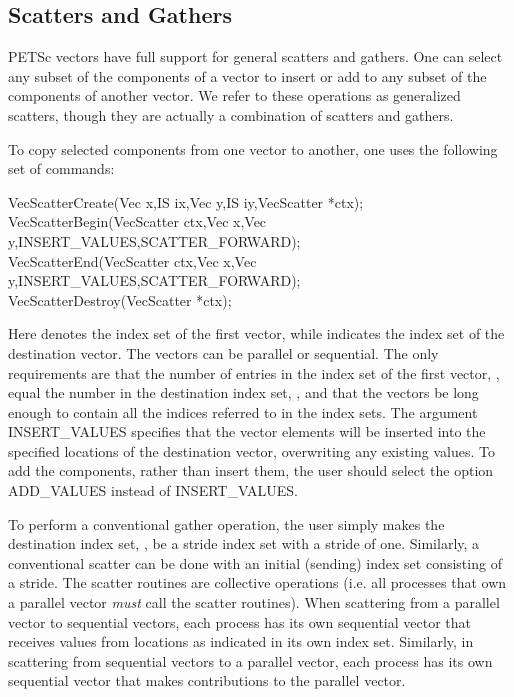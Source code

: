 \subsection{Scatters and Gathers}  
\label{sec_scatter}

PETSc vectors have full support for general scatters and
gathers. One can select any subset of the components of a vector to
insert or add to any subset of the components of another vector.
We refer to these operations as generalized scatters, though they are
actually a combination of scatters and gathers.

 
To copy selected components from one vector
to another, one uses the following set of commands:
\begin{tabbing}
  VecScatterCreate(Vec x,IS ix,Vec y,IS iy,VecScatter *ctx);\\
  VecScatterBegin(VecScatter ctx,Vec x,Vec y,INSERT\_VALUES,SCATTER\_FORWARD);\\
  VecScatterEnd(VecScatter ctx,Vec x,Vec y,INSERT\_VALUES,SCATTER\_FORWARD);\\
  VecScatterDestroy(VecScatter *ctx);
\end{tabbing}
Here  denotes the index set of the first vector, while  indicates the index set of the destination vector.  The vectors
can be parallel or sequential. The only requirements are that the
number of entries in the index set of the first vector, ,
equal the number in the destination index set, , and that the
vectors be long enough to contain all the indices referred to in the
index sets.  The argument INSERT\_VALUES specifies that the
vector elements will be inserted into the specified locations of the
destination vector, overwriting any existing values.  To add the
components, rather than insert them, the user should select the option
ADD\_VALUES instead of INSERT\_VALUES.

To perform a conventional gather operation, the user simply makes
 the destination index set,
, be a stride index set with a stride of one.  Similarly, a
conventional scatter can be done with an initial (sending) index set
consisting of a stride.  The scatter routines are collective operations
(i.e. all processes that own
a parallel vector {\em must} call the scatter routines). When scattering from a
parallel vector to sequential vectors, each process has its own sequential
vector that receives values from locations as indicated in its own
index set. Similarly, in scattering
from sequential vectors to a parallel vector, each process has its
own sequential vector that makes contributions to the parallel vector.

